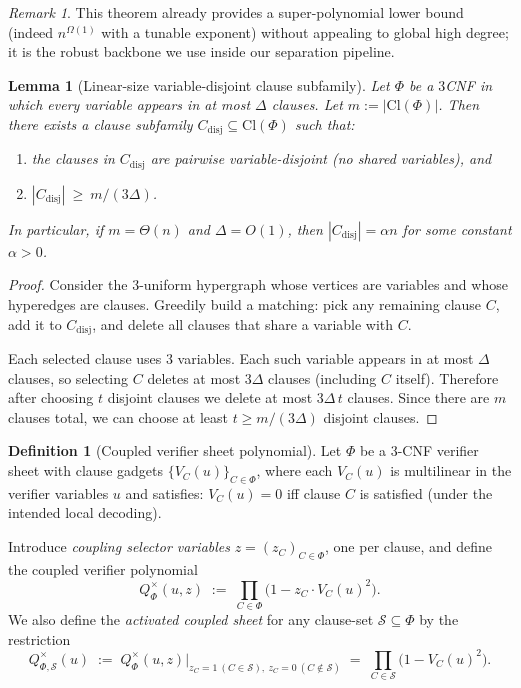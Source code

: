 \documentclass[12pt]{article}
\newtheorem{lemma}[theorem]{Lemma}
\theoremstyle{definition}
\newtheorem{definition}{Definition}
\theoremstyle{definition}
\theoremstyle{remark}
\newtheorem{remark}{Remark}
\theoremstyle{remark}
\begin{document}
\begin{remark}
This theorem already provides a super-polynomial lower bound (indeed $n^{\Omega(1)}$ with a tunable exponent) without appealing to global high degree; it is the robust backbone we use inside our separation pipeline.
\end{remark}

\begin{lemma}[Linear-size variable-disjoint clause subfamily]
\label{lem:disjoint-packing}\label{lem:linear-disjoint-clauses}
Let $\Phi$ be a $3$CNF in which every variable appears in at most $\Delta$ clauses.
Let $m:=|\mathrm{Cl}(\Phi)|$. Then there exists a clause subfamily
$C_{\mathrm{disj}}\subseteq \mathrm{Cl}(\Phi)$ such that:
\begin{enumerate}
\item the clauses in $C_{\mathrm{disj}}$ are pairwise variable-disjoint (no shared variables), and
\item $|C_{\mathrm{disj}}|\ \ge\ m/(3\Delta)$.
\end{enumerate}
In particular, if $m=\Theta(n)$ and $\Delta=O(1)$, then $|C_{\mathrm{disj}}|=\alpha n$ for some
constant $\alpha>0$.
\end{lemma}

\begin{proof}
Consider the $3$-uniform hypergraph whose vertices are variables and whose hyperedges are
clauses. Greedily build a matching: pick any remaining clause $C$, add it to
$C_{\mathrm{disj}}$, and delete all clauses that share a variable with $C$.

Each selected clause uses $3$ variables. Each such variable appears in at most $\Delta$ clauses,
so selecting $C$ deletes at most $3\Delta$ clauses (including $C$ itself). Therefore after
choosing $t$ disjoint clauses we delete at most $3\Delta\,t$ clauses. Since there are $m$ clauses
total, we can choose at least $t \ge m/(3\Delta)$ disjoint clauses.
\end{proof}


\begin{definition}[Coupled verifier sheet polynomial]\label{def:Qphi-times}
Let $\Phi$ be a 3-CNF verifier sheet with clause gadgets $\{V_C(u)\}_{C\in\Phi}$,
where each $V_C(u)$ is multilinear in the verifier variables $u$ and satisfies:
$V_C(u)=0$ iff clause $C$ is satisfied (under the intended local decoding).

Introduce \emph{coupling selector variables} $z=(z_C)_{C\in\Phi}$, one per clause,
and define the coupled verifier polynomial
\[
Q_\Phi^{\times}(u,z)\;:=\;\prod_{C\in\Phi}\bigl(1 - z_C \cdot V_C(u)^2\bigr).
\]
We also define the \emph{activated coupled sheet} for any clause-set
$\mathcal{S}\subseteq \Phi$ by the restriction
\[
Q_{\Phi,\mathcal{S}}^{\times}(u)\;:=\;Q_\Phi^{\times}(u,z)\Big|_{z_C=1\ (C\in\mathcal{S}),\ z_C=0\ (C\notin\mathcal{S})}
\;=\;\prod_{C\in\mathcal{S}}\bigl(1 - V_C(u)^2\bigr).
\]
\end{definition}
\end{document}
